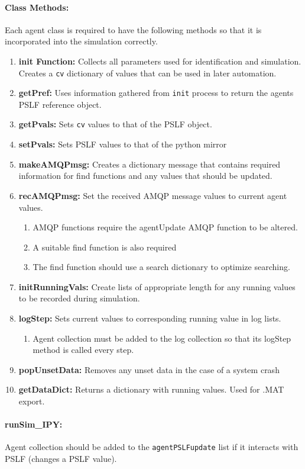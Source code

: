 \documentclass[12pt]{article}
\begin{document}
\paragraph{Class Methods:} Each agent class is required to have the following methods so that it is incorporated into the simulation correctly.
\begin{enumerate}
\item \textbf{init Function:} Collects all parameters used for identification and simulation. Creates a \verb|cv| dictionary of values that can be used in later automation.
\item \textbf{getPref:} Uses information gathered from \verb|init| process to return the agents PSLF reference object.
\item \textbf{getPvals:} Sets \verb|cv| values to that of the PSLF object.
\item \textbf{setPvals:} Sets PSLF values to that of the python mirror
\item \textbf{makeAMQPmsg:} Creates a dictionary message that contains required information for find functions and any values that should be updated.
\item \textbf{recAMQPmsg:} Set the received AMQP message values to current agent values.
\begin{enumerate}
\item AMQP functions require the agentUpdate AMQP function to be altered.
\item A suitable find function is also required
\item The find function should use a search dictionary to optimize searching.
\end{enumerate}
\item \textbf{initRunningVals:} Create lists of appropriate length for any running values to be recorded during simulation.
\item \textbf{logStep:} Sets current values to corresponding running value in log lists.
\begin{enumerate}
\item Agent collection must be added to the log collection so that its logStep method is called every step.
\end{enumerate}
\item \textbf{popUnsetData:} Removes any unset data in the case of a system crash
\item \textbf{getDataDict:} Returns a dictionary with running values. Used for .MAT export.
\end{enumerate} 
\paragraph{runSim\_IPY:} Agent collection should be added to the \verb|agentPSLFupdate| list if it interacts with PSLF (changes a PSLF value).
\end{document}
